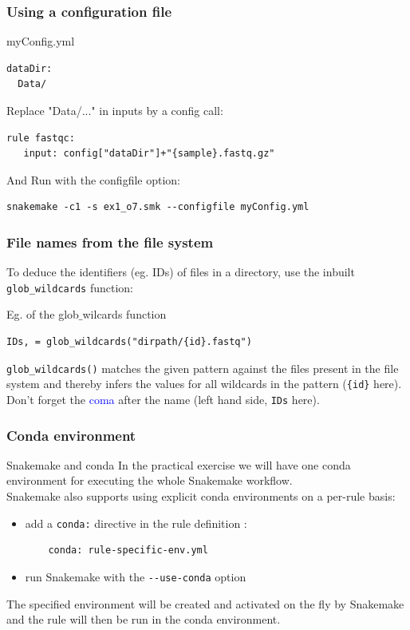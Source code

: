 \begin{frame}[containsverbatim]
\frametitle{Using a configuration file}
\begin{exampleblock}{myConfig.yml}
\begin{lstlisting}
dataDir:
  Data/
\end{lstlisting}
\end{exampleblock}
\begin{exampleblock}{Replace "Data/..." in inputs by a config call:}
\begin{lstlisting}
rule fastqc:   
   input: config["dataDir"]+"{sample}.fastq.gz"
\end{lstlisting}
\end{exampleblock}
\begin{exampleblock}{And Run with the configfile option:}
\begin{lstlisting}
snakemake -c1 -s ex1_o7.smk --configfile myConfig.yml
\end{lstlisting}
\end{exampleblock}
\end{frame}
\begin{frame}[containsverbatim]
\frametitle{File names from the file system}
To deduce the identifiers (eg. IDs) of files in a directory, use the inbuilt \verb|glob_wildcards| function:
\begin{block}{Eg. of the glob$\_$wilcards function}
\begin{lstlisting}
IDs, = glob_wildcards("dirpath/{id}.fastq")
\end{lstlisting}
\end{block}
\verb|glob_wildcards()| matches the given pattern against the files present in the file system and thereby infers the values for all wildcards in the pattern (\verb|{id}| here). 
\vfill
Don't forget the \textcolor{blue}{coma} after the name (left hand side, \verb|IDs| here).
\end{frame}
\begin{frame}[containsverbatim]
\frametitle{Conda environment}
\begin{block}{Snakemake and conda}
In the practical exercise we will have one conda environment for executing the whole Snakemake workflow. \\
Snakemake also supports using explicit conda environments on a per-rule basis:
\begin{itemize}
    \item add a \verb|conda:| directive in the rule definition :
\begin{lstlisting}
    conda: rule-specific-env.yml
\end{lstlisting}
    \item run Snakemake with the \verb|--use-conda| option
\end{itemize}
The specified environment will be created and activated on the fly by Snakemake and the rule will then be run in the conda environment.
\end{block}
\end{frame}
